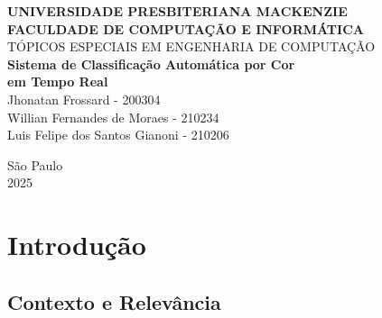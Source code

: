 \documentclass[12pt,a4paper]{article}
\begin{document}
\begin{titlepage}
    \centering
    \vspace*{2cm}

    {\Large\bfseries UNIVERSIDADE PRESBITERIANA MACKENZIE}\\[0.5cm]
    {\Large\bfseries FACULDADE DE COMPUTAÇÃO E INFORMÁTICA}\\[3cm]

    {\Large TÓPICOS ESPECIAIS EM ENGENHARIA DE COMPUTAÇÃO}\\[2cm]

    {\huge\bfseries Sistema de Classificação Automática por Cor\\[0.3cm] em Tempo Real}\\[4cm]

    {\large
    Jhonatan Frossard - 200304\\
    Willian Fernandes de Moraes - 210234\\
    Luis Felipe dos Santos Gianoni - 210206
    }\\[3cm]

    \vfill

    {\large São Paulo}\\
    {\large 2025}
\end{titlepage}

\newpage

\renewcommand{\contentsname}{SUMÁRIO}
\tableofcontents

\newpage

\renewcommand{\listfigurename}{LISTA DE FIGURAS}
\listoffigures

\newpage

\renewcommand{\listtablename}{LISTA DE TABELAS}
\listoftables

\newpage

\section{Introdução}

\subsection{Contexto e Relevância}
\end{document}
